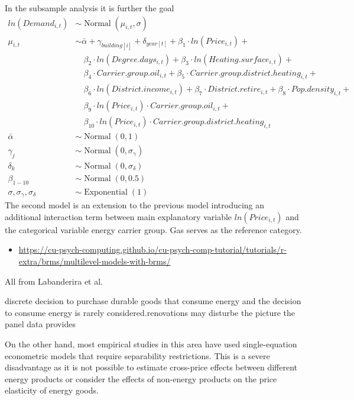 \documentclass[12pt,twoside]{reedthesis}
\providecommand{\tightlist}{%
  \setlength{\itemsep}{0pt}\setlength{\parskip}{0pt}}
\begin{document}
In the subsample analysis it is further the goal
\begin{align*}
ln(Demand_{i,t}) & \sim \operatorname{Normal}(\mu_{i,t}, \sigma) \\
\mu_{i,t} & \sim \bar\alpha + \gamma_{building[i]} + \delta_{year[t]} + \beta_1 \cdot ln(Price_{i,t}) +  \\
 & \quad \beta_{2} \cdot ln(Degree.days_{i,t}) + \beta_{3} \cdot ln(Heating.surface_{i,t}) + \\
 & \quad \beta_{4} \cdot Carrier.group.oil_{i,t} + \beta_{5} \cdot Carrier.group.district.heating_{i,t} + \\
 & \quad \beta_{6} \cdot ln(District.income_{i,t}) + \beta_{7} \cdot District.retire_{i,t} + \beta_{8} \cdot Pop.density_{i,t} + \\
 & \quad \beta_{9} \cdot ln(Price_{i,t}) \cdot Carrier.group.oil_{i,t} + \\
 & \quad \beta_{10} \cdot ln(Price_{i,t}) \cdot Carrier.group.district.heating_{i,t} \\
\bar\alpha & \sim \operatorname{Normal}(0, 1) \\
\gamma_j & \sim \operatorname{Normal}(0, \sigma_{\gamma}) \\
\delta_k & \sim \operatorname{Normal}(0, \sigma_{\delta}) \\
\beta_{1-10} & \sim \operatorname{Normal}(0, 0.5) \\
\sigma, \sigma_{\gamma}, \sigma_{\delta} & \sim \operatorname{Exponential}(1)
\end{align*}
The second model is an extension to the previous model introducing an additional interaction term between main explanatory variable \(ln(Price_{i,t})\) and the categorical variable energy carrier group. Gas serves as the reference category.
\begin{itemize}
\tightlist
\item
  \url{https://cu-psych-computing.github.io/cu-psych-comp-tutorial/tutorials/r-extra/brms/multilevel-models-with-brms/}
\end{itemize}
All from Labanderira et al.

discrete decision to purchase durable goods that consume energy and the decision to consume energy is rarely considered.renovations may disturbe the picture the panel data provides

On the other hand, most empirical studies in this area have used single-equation econometric models that require separability restrictions. This is a severe disadvantage as it is not possible to estimate cross-price effects between different energy products or consider the effects of non-energy products on the price elasticity of energy goods.
\end{document}
